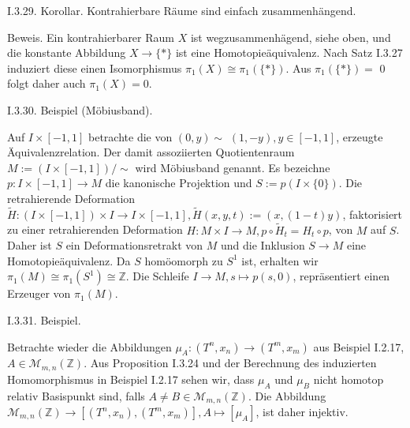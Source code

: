 \documentclass[10pt, letterpaper]{article}
\begin{document}
I.3.29. Korollar. Kontrahierbare Räume sind einfach zusammenhängend.

Beweis. Ein kontrahierbarer Raum $X$ ist wegzusammenhägend, siehe oben, und die konstante Abbildung $X \rightarrow\{*\}$ ist eine Homotopieäquivalenz. Nach Satz I.3.27 induziert diese einen Isomorphismus $\pi_{1}(X) \cong \pi_{1}(\{*\})$. Aus $\pi_{1}(\{*\})=$ 0 folgt daher auch $\pi_{1}(X)=0$.



I.3.30. Beispiel (Möbiusband). 

Auf $I \times[-1,1]$ betrachte die von $(0, y) \sim$ $(1,-y), y \in[-1,1]$, erzeugte Äquivalenzrelation. Der damit assoziierten Quotientenraum $M:=(I \times[-1,1]) / \sim$ wird Möbiusband genannt. Es bezeichne $p: I \times[-1,1] \rightarrow M$ die kanonische Projektion und $S:=p(I \times\{0\})$. Die retrahierende Deformation $\tilde{H}:(I \times[-1,1]) \times I \rightarrow I \times[-1,1], \tilde{H}(x, y, t):=(x,(1-t) y)$, faktorisiert zu einer retrahierenden Deformation $H: M \times I \rightarrow M, p \circ \tilde{H}_{t}=H_{t} \circ p$, von $M$ auf $S$. Daher ist $S$ ein Deformationsretrakt von $M$ und die Inklusion $S \rightarrow M$ eine Homotopieäquivalenz. Da $S$ homöomorph zu $S^{1}$ ist, erhalten wir $\pi_{1}(M) \cong \pi_{1}\left(S^{1}\right) \cong \mathbb{Z}$. Die Schleife $I \rightarrow M, s \mapsto p(s, 0)$, repräsentiert einen Erzeuger von $\pi_{1}(M)$.


I.3.31. Beispiel. 

Betrachte wieder die Abbildungen $\mu_{A}:\left(T^{n}, x_{n}\right) \rightarrow\left(T^{m}, x_{m}\right)$ aus Beispiel I.2.17, $A \in \mathcal{M}_{m, n}(\mathbb{Z})$. Aus Proposition I.3.24 und der Berechnung des induzierten Homomorphismus in Beispiel I.2.17 sehen wir, dass $\mu_{A}$ und $\mu_{B}$ nicht homotop relativ Basispunkt sind, falls $A \neq B \in \mathcal{M}_{m, n}(\mathbb{Z})$. Die Abbildung $\mathcal{M}_{m, n}(\mathbb{Z}) \rightarrow\left[\left(T^{n}, x_{n}\right),\left(T^{m}, x_{m}\right)\right], A \mapsto\left[\mu_{A}\right]$, ist daher injektiv.
\end{document}
